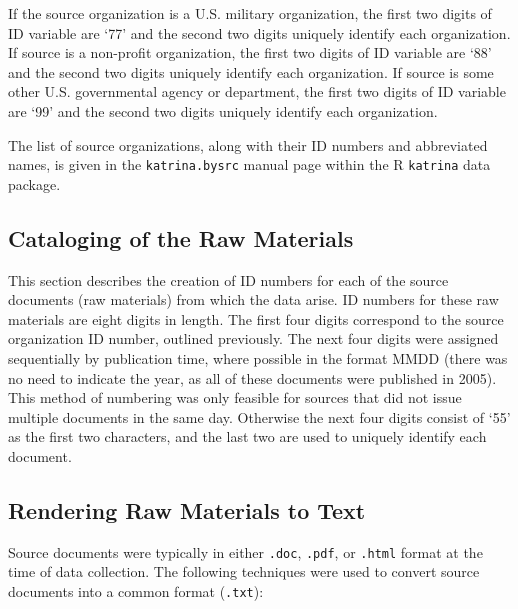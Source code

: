\documentclass[11pt]{article}
\begin{document}
If the source organization is a U.S. military organization, the first two digits of ID variable are `77' and the second two digits uniquely identify each organization.  If source is a non-profit organization, the first two digits of ID variable are `88' and the second two digits uniquely identify each organization.  If source is some other U.S. governmental agency or department, the first two digits of ID variable are `99' and the second two digits uniquely identify each organization.

The list of source organizations, along with their ID numbers and abbreviated names, is given in the  \texttt{katrina.bysrc} manual page within the R \texttt{katrina} data package.

\subsection{Cataloging of the Raw Materials}

This section describes the creation of ID numbers for each of the source documents (raw materials) from which the data arise.  ID numbers for these raw materials are eight digits in length.  The first four digits correspond to the source organization ID number, outlined previously. The next four digits were assigned sequentially by publication time, where possible in the format MMDD (there was no need to indicate the year, as all of these documents were published in 2005). This method of numbering was only feasible for sources that did not issue multiple documents in the same day. Otherwise the next four digits consist of `55' as the first two characters, and the last two are used to uniquely identify each document.

\subsection{Rendering Raw Materials to Text}

Source documents were typically in either \texttt{.doc}, \texttt{.pdf}, or \texttt{.html} format at the time of data collection. The following techniques were used to convert source documents into a common format (\texttt{.txt}):
\end{document}
